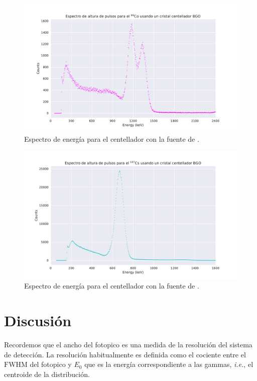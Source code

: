 \documentclass[12pt]{article}
\newcommand{\idest}{\emph{i.e.},\xspace} %
\begin{document}
    \begin{figure}[!htb]
        \centering
        \includegraphics[scale = 0.7]{energy_spectrum_BGOCo.pdf}
        \caption{Espectro de energía para el centellador  con la fuente de .}
        \label{fig:bgoCoSpectrum}
    \end{figure}

    \begin{figure}[!htb]
        \centering
        \includegraphics[scale = 0.7]{energy_spectrum_BGOCs.pdf}
        \caption{Espectro de energía para el centellador  con la fuente de .}
        \label{fig:bgoCsSpectrum}
    \end{figure}

    \section*{Discusión}
    
    Recordemos que el ancho del fotopico es una medida de la resolución del sistema de detección. La resolución habitualmente es definida como el cociente entre el \(\text{FWHM}\) del fotopico y \(E_{0}\) que es la energía correspondiente a las gammas, \idest el centroide de la distribución.
\end{document}
